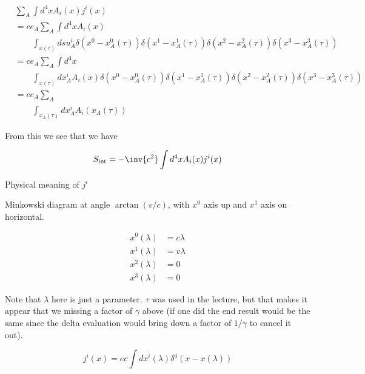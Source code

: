 \begin{equation}\label{eqn:relativisticElectrodynamicsL12b:610}
\begin{aligned}
&\sum_A \int d^4 x A_i(x) j^i(x) \\
&= 
c e_A \sum_A \int d^4 x A_i(x) \\
&\qquad \int_{x(\tau)}
ds u^i_A 
\delta(x^0 - x^0_A(\tau))
\delta(x^1 - x^1_A(\tau))
\delta(x^2 - x^2_A(\tau))
\delta(x^3 - x^3_A(\tau)) \\
&= 
c e_A \sum_A 
\int d^4 x \\
&\qquad \int_{x(\tau)}
dx^i_A 
A_i(x) 
\delta(x^0 - x^0_A(\tau))
\delta(x^1 - x^1_A(\tau))
\delta(x^2 - x^2_A(\tau))
\delta(x^3 - x^3_A(\tau)) \\
&=
c e_A \sum_A \\
&\qquad \int_{x_A(\tau)}
dx^i_A 
A_i(x_A(\tau)) 
\end{aligned}
\end{equation}

From this we see that we have

\begin{equation}\label{eqn:relativisticElectrodynamicsL12b:430}
S_{\text{int}} = -\inv{c^2} \int d^4 x A_i(x) j^i(x) 
\end{equation}

Physical meaning of \(j^i\)

Minkowski diagram at angle \(\arctan(v/c)\), with \(x^0\) axis up and \(x^1\) axis on horizontal.

\begin{equation}\label{eqn:relativisticElectrodynamicsL12b:450}
\begin{aligned}
x^0(\lambda) &= c \lambda \\
x^1(\lambda) &= v \lambda \\
x^2(\lambda) &= 0 \\
x^3(\lambda) &= 0
\end{aligned}
\end{equation}

Note that \(\lambda\) here is just a parameter.  \(\tau\) was used in the lecture, but that makes it appear that we missing a factor of \(\gamma\) above (if one did the end result would be the same since the delta evaluation would bring down a factor of \(1/\gamma\) to cancel it out).

\begin{equation}\label{eqn:relativisticElectrodynamicsL12b:470}
j^i(x) = e c \int dx^i(\lambda) \delta^4 (x - x(\lambda))
\end{equation}

